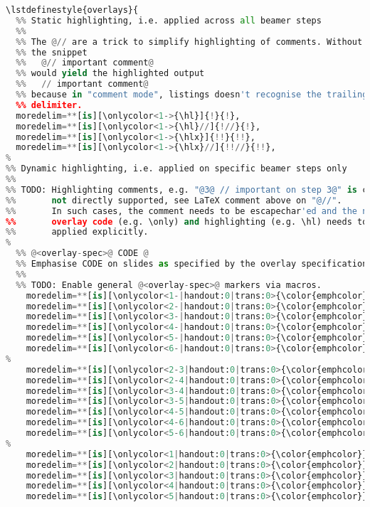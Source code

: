 {\begin{lstlisting}[language=Python,style=normal,escapechar=?,morekeywords={True, False}, mathescape]
\lstdefinestyle{overlays}{
  %% Static highlighting, i.e. applied across all beamer steps
  %%
  %% The @// are a trick to simplify highlighting of comments. Without these,
  %% the snippet
  %%   @// important comment@
  %% would yield the highlighted output
  %%   // important comment@
  %% because in "comment mode", listings doesn't recognise the trailing 
  %% delimiter.
  moredelim=**[is][\onlycolor<1->{\hl}]{!}{!},
  moredelim=**[is][\onlycolor<1->{\hl}//]{!//}{!},
  moredelim=**[is][\onlycolor<1->{\hlx}]{!!}{!!},
  moredelim=**[is][\onlycolor<1->{\hlx}//]{!!//}{!!},
%
%% Dynamic highlighting, i.e. applied on specific beamer steps only
%%
%% TODO: Highlighting comments, e.g. "@3@ // important on step 3@" is currently 
%%       not directly supported, see LaTeX comment above on "@//".
%%       In such cases, the comment needs to be escapechar'ed and the necessary
%%       overlay code (e.g. \only) and highlighting (e.g. \hl) needs to be 
%%       applied explicitly.
%
  %% @<overlay-spec>@ CODE @
  %% Emphasise CODE on slides as specified by the overlay specification
  %%
  %% TODO: Enable general @<overlay-spec>@ markers via macros.
	moredelim=**[is][\onlycolor<1-|handout:0|trans:0>{\color{emphcolor}}]{@1-@}{@},
	moredelim=**[is][\onlycolor<2-|handout:0|trans:0>{\color{emphcolor}}]{@2-@}{@},
	moredelim=**[is][\onlycolor<3-|handout:0|trans:0>{\color{emphcolor}}]{@3-@}{@},
	moredelim=**[is][\onlycolor<4-|handout:0|trans:0>{\color{emphcolor}}]{@4-@}{@},
	moredelim=**[is][\onlycolor<5-|handout:0|trans:0>{\color{emphcolor}}]{@5-@}{@},
	moredelim=**[is][\onlycolor<6-|handout:0|trans:0>{\color{emphcolor}}]{@6-@}{@},
%
	moredelim=**[is][\onlycolor<2-3|handout:0|trans:0>{\color{emphcolor}}]{@2-3@}{@},
	moredelim=**[is][\onlycolor<2-4|handout:0|trans:0>{\color{emphcolor}}]{@2-4@}{@},
	moredelim=**[is][\onlycolor<3-4|handout:0|trans:0>{\color{emphcolor}}]{@3-4@}{@},
	moredelim=**[is][\onlycolor<3-5|handout:0|trans:0>{\color{emphcolor}}]{@3-5@}{@},
	moredelim=**[is][\onlycolor<4-5|handout:0|trans:0>{\color{emphcolor}}]{@4-5@}{@},
	moredelim=**[is][\onlycolor<4-6|handout:0|trans:0>{\color{emphcolor}}]{@4-6@}{@},
	moredelim=**[is][\onlycolor<5-6|handout:0|trans:0>{\color{emphcolor}}]{@5-6@}{@},
%
	moredelim=**[is][\onlycolor<1|handout:0|trans:0>{\color{emphcolor}}]{@1@}{@},
	moredelim=**[is][\onlycolor<2|handout:0|trans:0>{\color{emphcolor}}]{@2@}{@},
	moredelim=**[is][\onlycolor<3|handout:0|trans:0>{\color{emphcolor}}]{@3@}{@},
	moredelim=**[is][\onlycolor<4|handout:0|trans:0>{\color{emphcolor}}]{@4@}{@},
	moredelim=**[is][\onlycolor<5|handout:0|trans:0>{\color{emphcolor}}]{@5@}{@},

\end{lstlisting}}
